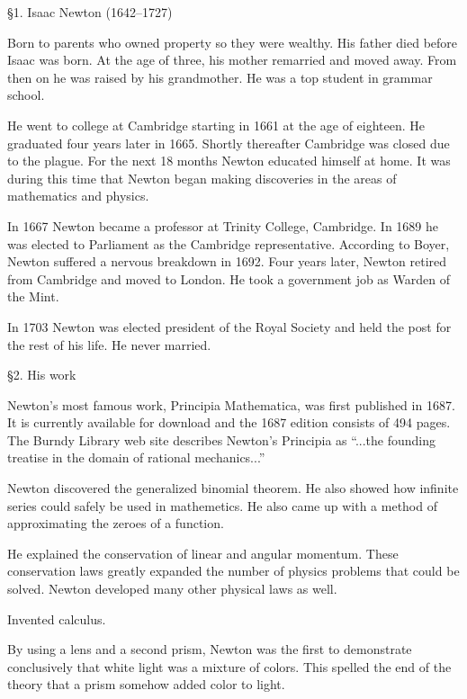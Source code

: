 \item{\S1.} Isaac Newton (1642--1727)

Born to parents who owned property so they were wealthy.
His father died before Isaac was born.
At the age of three, his mother remarried and moved away.
From then on he was raised by his grandmother.
He was a top student in grammar school.

He went to college at Cambridge starting in 1661 at the age
of eighteen.
He graduated four years later in 1665.
Shortly thereafter Cambridge was closed due to the plague.
For the next 18 months Newton educated himself at home.
It was during this time that Newton began making
discoveries in the areas of mathematics and physics.

In 1667 Newton became a professor at Trinity College, Cambridge.
In 1689 he was elected to Parliament as the Cambridge representative.
According to Boyer, Newton suffered a nervous breakdown in 1692.
Four years later, Newton retired from Cambridge and moved to London.
He took a government job as Warden of the Mint.

In 1703 Newton was elected president of the Royal Society and
held the post for the rest of his life.
He never married.

\item{\S2.} His work

Newton's most famous work, Principia Mathematica, was
first published in 1687.
It is currently available for download and the 1687
edition consists of 494 pages.
The Burndy Library web site describes Newton's Principia as
``...the founding treatise in the domain of rational mechanics...''

Newton discovered the generalized binomial theorem.
He also showed how infinite series could safely be used in mathemetics.
He also came up with a method of approximating the zeroes of a function.

He explained the conservation of linear and angular momentum.
These conservation laws greatly expanded the number of physics
problems that could be solved.
Newton developed many other physical laws as well.

Invented calculus.

By using a lens and a second prism, Newton was the first to demonstrate 
conclusively that white light was a mixture of colors.
This spelled the end of the theory that a prism somehow added
color to light.

